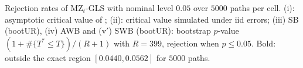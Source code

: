 Rejection rates of MZ$_t$-GLS with nominal level $0.05$ over $5000$ paths per cell. (i): asymptotic critical value of \citet{ng2001lag}; (ii): critical value simulated under iid errors; (iii) SB (bootUR), (iv) AWB and (v$'$) SWB (bootUR): bootstrap $p$-value $(1 + \#\{T^* \leq T\})/(R + 1)$ with $R = 399$, rejection when $p \leq 0.05$. Bold: outside the exact region $[0.0440, 0.0562]$ for $5000$ paths.
